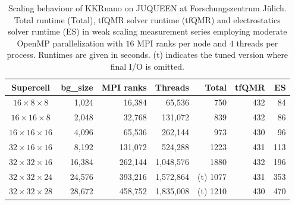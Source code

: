 \documentclass [a4paper, 12pt]{article}
\begin{document}
\begin{table}[h!]
	\caption{Scaling behaviour of KKRnano on JUQUEEN at Forschungszentrum J{\"u}lich. 
		Total runtime (Total), tfQMR solver runtime (tfQMR) and electrostatics solver runtime (ES)
		    in weak scaling measurement series employing moderate OpenMP parallelization
		      with $16$ MPI ranks per node and $4$ threads per process. 
		        Runtimes are given in seconds. (t) indicates the tuned version where final I/O is omitted.}
			\begin{center}
				\begin{tabular}{|c|r|r|r|r|r|r|}
					\hline
					 Supercell               & bg\_size & MPI ranks &   Threads &    Total & tfQMR &  ES \\
					\hline\hline
					$16 \times  8 \times  8$ &  1,024   &  16,384   &    65,536 &      750 &   432 &  84 \\
					$16 \times 16 \times  8$ &  2,048   &  32,768   &   131,072 &      839 &   432 &  86 \\
					$16 \times 16 \times 16$ &  4,096   &  65,536   &   262,144 &      973 &   430 &  96 \\
					$32 \times 16 \times 16$ &  8,192   & 131,072   &   524,288 &     1223 &   431 & 113 \\
					$32 \times 32 \times 16$ & 16,384   & 262,144   & 1,048,576 &     1880 &   432 & 196 \\
					$32 \times 32 \times 24$ & 24,576   & 393,216   & 1,572,864 & (t) 1077 &   431 & 353 \\
					$32 \times 32 \times 28$ & 28,672   & 458,752   & 1,835,008 & (t) 1210 &   430 & 470 \\
					\hline
				\end{tabular}
			\end{center}
			\label{kkrnano:mnge_weakscaling_moderateomp}
		\end{table}
\end{document}

